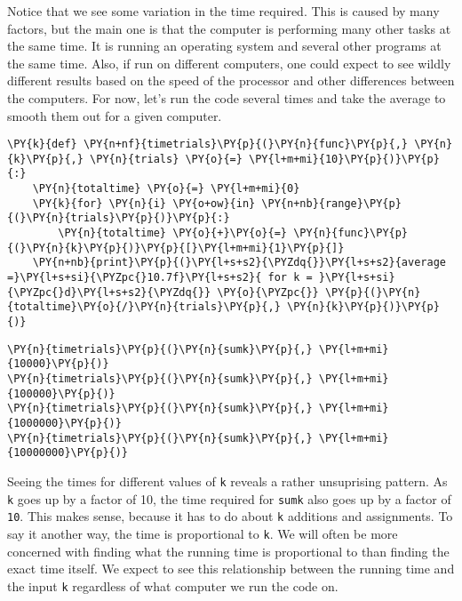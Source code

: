 Notice that we see some variation in the time required.
This is caused by many factors, but the main one is that the computer is performing many other tasks at the same time.
It is running an operating system and several other programs at the same time.
Also, if run on different computers, one could expect to see wildly different results based on the speed of the processor and other differences between the computers.
For now, let's run the code several times and take the average to smooth them out for a given computer.

\begin{Verbatim}[commandchars=\\\{\}]
\PY{k}{def} \PY{n+nf}{timetrials}\PY{p}{(}\PY{n}{func}\PY{p}{,} \PY{n}{k}\PY{p}{,} \PY{n}{trials} \PY{o}{=} \PY{l+m+mi}{10}\PY{p}{)}\PY{p}{:}
    \PY{n}{totaltime} \PY{o}{=} \PY{l+m+mi}{0}
    \PY{k}{for} \PY{n}{i} \PY{o+ow}{in} \PY{n+nb}{range}\PY{p}{(}\PY{n}{trials}\PY{p}{)}\PY{p}{:}
        \PY{n}{totaltime} \PY{o}{+}\PY{o}{=} \PY{n}{func}\PY{p}{(}\PY{n}{k}\PY{p}{)}\PY{p}{[}\PY{l+m+mi}{1}\PY{p}{]}
    \PY{n+nb}{print}\PY{p}{(}\PY{l+s+s2}{\PYZdq{}}\PY{l+s+s2}{average =}\PY{l+s+si}{\PYZpc{}10.7f}\PY{l+s+s2}{ for k = }\PY{l+s+si}{\PYZpc{}d}\PY{l+s+s2}{\PYZdq{}} \PY{o}{\PYZpc{}} \PY{p}{(}\PY{n}{totaltime}\PY{o}{/}\PY{n}{trials}\PY{p}{,} \PY{n}{k}\PY{p}{)}\PY{p}{)}
\end{Verbatim}


\begin{Verbatim}[commandchars=\\\{\}]
\PY{n}{timetrials}\PY{p}{(}\PY{n}{sumk}\PY{p}{,} \PY{l+m+mi}{10000}\PY{p}{)}
\PY{n}{timetrials}\PY{p}{(}\PY{n}{sumk}\PY{p}{,} \PY{l+m+mi}{100000}\PY{p}{)}
\PY{n}{timetrials}\PY{p}{(}\PY{n}{sumk}\PY{p}{,} \PY{l+m+mi}{1000000}\PY{p}{)}
\PY{n}{timetrials}\PY{p}{(}\PY{n}{sumk}\PY{p}{,} \PY{l+m+mi}{10000000}\PY{p}{)}
\end{Verbatim}



Seeing the times for different values of \texttt{k} reveals a rather unsuprising pattern.
As \texttt{k} goes up by a factor of 10, the time required for \texttt{sumk} also goes up by a factor of \texttt{10}.
This makes sense, because it has to do about \texttt{k} additions and assignments.
To say it another way, the time is proportional to \texttt{k}.
We will often be more concerned with finding what the running time is proportional to than finding the exact time itself.
We expect to see this relationship between the running time and the input \texttt{k} regardless of what computer we run the code on.


